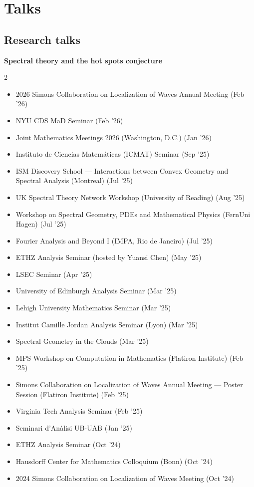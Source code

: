 \section{Talks}

\subsection{\textbf{\color{color1} Research talks}}

\textbf{Spectral theory and the hot spots conjecture}
\nopagebreak
\begin{small}
\begin{multicols}{2}
\begin{itemize}\setlength\itemsep{0pt}
  \item 2026 Simons Collaboration on Localization of Waves Annual Meeting (Feb '26)
  \item NYU CDS MaD Seminar (Feb '26)
  \item Joint Mathematics Meetings 2026 (Washington, D.C.) (Jan '26)
  \item Instituto de Ciencias Matemáticas (ICMAT) Seminar (Sep '25)
  \item ISM Discovery School — Interactions between Convex Geometry and Spectral Analysis (Montreal) (Jul '25)
  \item UK Spectral Theory Network Workshop (University of Reading) (Aug '25)
  \item Workshop on Spectral Geometry, PDEs and Mathematical Physics (FernUni Hagen) (Jul '25)
  \item Fourier Analysis and Beyond I (IMPA, Rio de Janeiro) (Jul '25)
  \item ETHZ Analysis Seminar (hosted by Yuansi Chen) (May '25)
  \item LSEC Seminar (Apr '25)
  \item University of Edinburgh Analysis Seminar (Mar '25)
  \item Lehigh University Mathematics Seminar (Mar '25)
  \item Institut Camille Jordan Analysis Seminar (Lyon) (Mar '25)
  \item Spectral Geometry in the Clouds (Mar '25)
  \item MPS Workshop on Computation in Mathematics (Flatiron Institute) (Feb '25)
  \item Simons Collaboration on Localization of Waves Annual Meeting — Poster Session (Flatiron Institute) (Feb '25)
  \item Virginia Tech Analysis Seminar (Feb '25)
  \item Seminari d'Anàlisi UB-UAB (Jan '25)
  \item ETHZ Analysis Seminar (Oct '24)
  \item Hausdorff Center for Mathematics Colloquium (Bonn) (Oct '24)
  \item 2024 Simons Collaboration on Localization of Waves Meeting (Oct '24)
\end{itemize}
\end{multicols}
\end{small}

